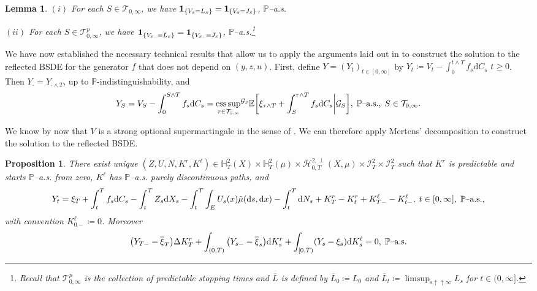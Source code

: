 \documentclass[10pt]{article} %
\newtheorem{lemma}[theorem]{Lemma}
\newtheorem{proposition}[theorem]{Proposition}
\newcommand\cG{\mathcal G}
\newcommand\cH{\mathcal H}
\newcommand\cI{\mathcal I}
\newcommand\cT{\mathcal T}
\newcommand{\smalltext}[1]{\text{\fontsize{4}{4}\selectfont$#1$}}
\def \E{\mathbb{E}}
\def \H{\mathbb{H}}
\def \P{\mathbb{P}}
\def\d{\mathrm{d}}
\DeclareMathOperator*{\esssup}{ess\,sup}
\begin{document}
\begin{lemma}\label{lem::snell_indicator}
	$(i)$ For each $S \in \cT_{0,\infty}$, we have $\mathbf{1}_{\{V_\smalltext{S} = L_\smalltext{S}\}} = \mathbf{1}_{\{V_\smalltext{S} = J_\smalltext{S}\}}$, $\P${\rm--a.s.}
	
	\medskip
	$(ii)$ For each $S \in \cT^p_{0,\infty}$, we have $\mathbf{1}_{\{V_{\smalltext{S}\smalltext{-}} = \bar L_\smalltext{S}\}} = \mathbf{1}_{\{V_{\smalltext{S}\smalltext{-}} = \bar J_\smalltext{S}\}}$, $\P${\rm--a.s.}\footnote{Recall that $\cT^p_{0,\infty}$ is the collection of predictable stopping times and $\overline L$ is defined by $\overline L_0 \coloneqq L_0$ and $\overline L_t \coloneqq \limsup_{s \uparrow\uparrow \infty} L_s$ for $t \in (0,\infty]$.}
\end{lemma}


	
We have now established the necessary technical results that allow us to apply the arguments laid out in \cite{grigorova2020optimal} to construct the solution to the reflected BSDE for the generator $f$ that does not depend on $(y,z,u)$. First, define $Y = (Y_t)_{t \in [0,\infty]}$ by $Y_t \coloneqq V_t - \int_0^{t \land T} f_s \d C_s$ $t\geq 0$. Then $Y_\cdot = Y_{\cdot \land T}$, up to $\P$-indistinguishability, and
\begin{equation*}
	Y_S = V_S - \int_0^{S \land T} f_s \d C_s = {\esssup_{\tau \in \cT_{\smalltext{S}\smalltext{,}\smalltext{\infty}}}}^{\cG_\smalltext{S}} \E\bigg[\xi_{\tau \land T} + \int_S^{\tau \land T} f_s \d C_s \bigg| \cG_S\bigg], \; \text{$\P$--a.s.}, \; S \in \cT_{0,\infty}.
\end{equation*}

We know by now that $V$ is a strong optional supermartingale in the sense of \cite[Appendix I]{dellacherie1982probabilities}. We can therefore apply Mertens' decomposition to construct the solution to the reflected BSDE.

\begin{proposition}\label{lem::snell_decomposition}
	There exist unique $(Z,U,N,K^r,K^\ell) \in \H^2_T(X) \times \H^2_T(\mu) \times \cH^{2,\perp}_{0,T}(X,\mu) \times \cI^2_T \times \cI^2_T$ such that $K^r$ is predictable and starts $\P$--{\rm a.s.} from zero, $K^\ell$ has $\P$--{\rm a.s.} purely discontinuous paths, and
		\begin{equation*}
			Y_t = \xi_T + \int_t^T f_s \d C_s - \int_t^T Z_s\d X_s - \int_t^T\int_E U_s(x)\tilde\mu(\d s, \d x) - \int_t^T \d N_s + K^r_T - K^r_t + K^\ell_{T-} - K^\ell_{t-}, \; t \in [0,\infty], \; \text{$\P${\rm--a.s.}},
		\end{equation*}
		with convention $K^\ell_{0-}\coloneqq 0$. Moreover
	\[
		 \big(Y_{T-} - \overline{\xi}_T\big) \Delta K^r_T + \int_{(0,T)} \big(Y_{s-} - \overline{\xi}_s\big) \d K^r_s + \int_{[0,T)} (Y_s - \xi_s) \d K^\ell_s = 0, \;\text{$\P$\rm--a.s.}
	\]
\end{proposition}
\end{document}
